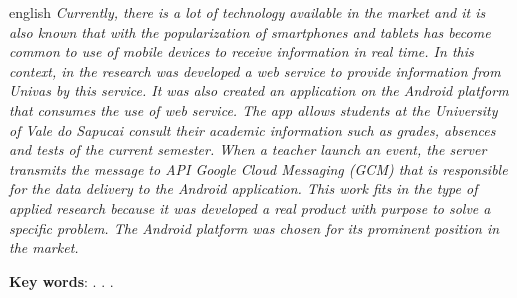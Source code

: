 
\begin{OnehalfSpacing} 


\vspace{\onelineskip}
\vspace{\onelineskip}
\vspace{\onelineskip}
\vspace{\onelineskip}

\begin{resumo}[Abstract]%
\begin{otherlanguage*}{english}%
\textit{
\noindent Currently, there is a lot of technology available in the market and it
is also known that with the popularization of smartphones and tablets has
become common to use of mobile devices to receive information in real time. In
this context, in the research was developed a web service to provide
information from Univas by this service. It was also created an application on
the Android platform that consumes the use of web service. The app allows
students at the University of Vale do Sapucai  consult their academic
information such as grades, absences and tests of the current semester. When a
teacher launch an event, the server transmits the message to API Google Cloud
Messaging (GCM) that is responsible for the data delivery to the Android
application. This work  fits in the type of applied research because it was
developed a real product with purpose to solve a specific problem. The Android
platform was chosen for its  prominent position in the market.
}

\vspace{\onelineskip}
\vspace*{\fill}
\noindent \textbf{Key words}: \imprimirKeyWordOne. \imprimirKeyWordTwo. \imprimirKeyWordThree.
\end{otherlanguage*}
\vspace{\onelineskip}
\end{resumo}

\end{OnehalfSpacing}

